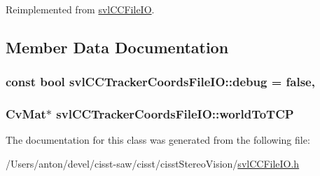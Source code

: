 Reimplemented from \hyperlink{classsvl_c_c_file_i_o_ab98a5780429fa2a83ffd118c00cf4d27}{svl\+C\+C\+File\+I\+O}.



\subsection{Member Data Documentation}
\hypertarget{classsvl_c_c_tracker_coords_file_i_o_aa792add13a0e86c73730b6f090dda22e}{}
\subsubsection[{debug}]{\setlength{\rightskip}{0pt plus 5cm}const bool svl\+C\+C\+Tracker\+Coords\+File\+I\+O\+::debug = false\hspace{0.3cm}{\ttfamily [static]}, {\ttfamily [protected]}}\label{classsvl_c_c_tracker_coords_file_i_o_aa792add13a0e86c73730b6f090dda22e}
\hypertarget{classsvl_c_c_tracker_coords_file_i_o_a52c6b69d40df95c9e2a2028415c3ac5f}{}
\subsubsection[{world\+To\+T\+C\+P}]{\setlength{\rightskip}{0pt plus 5cm}Cv\+Mat$\ast$ svl\+C\+C\+Tracker\+Coords\+File\+I\+O\+::world\+To\+T\+C\+P}\label{classsvl_c_c_tracker_coords_file_i_o_a52c6b69d40df95c9e2a2028415c3ac5f}


The documentation for this class was generated from the following file\+:\begin{DoxyCompactItemize}
\item 
/\+Users/anton/devel/cisst-\/saw/cisst/cisst\+Stereo\+Vision/\hyperlink{svl_c_c_file_i_o_8h}{svl\+C\+C\+File\+I\+O.\+h}\end{DoxyCompactItemize}

